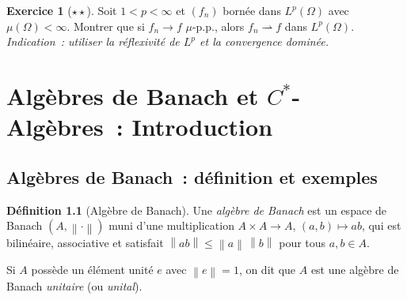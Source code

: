 \documentclass[a4paper,12pt]{book}
\newcommand{\norm}[1]{\left\| #1 \right\|}
\newcommand{\weakto}{\rightharpoonup}
\theoremstyle{definition}
\newtheorem{definition}{Définition}[chapter]
\newtheorem{exercice}{Exercice}[chapter]
\theoremstyle{plain}
\theoremstyle{remark}
\begin{document}
\begin{exercice}[$\star\star$]
Soit $1 < p < \infty$ et $(f_n)$ bornée dans $L^p(\Omega)$ avec $\mu(\Omega) < \infty$.
Montrer que si $f_n \to f$ $\mu$-p.p., alors $f_n \weakto f$ dans $L^p(\Omega)$.
\emph{Indication~: utiliser la réflexivité de $L^p$ et la convergence dominée.}
\end{exercice}


\chapter{Algèbres de Banach et $C^*$-Algèbres~: Introduction}
\label{chap:cstar}
\minitoc

\section{Algèbres de Banach~: définition et exemples}

\begin{definition}[Algèbre de Banach]
\label{def:alg-banach}
Une \emph{algèbre de Banach} est un espace de Banach $(A, \norm{\cdot})$ muni d'une
multiplication $A \times A \to A$, $(a,b) \mapsto ab$, qui est bilinéaire, associative et
satisfait $\norm{ab} \le \norm{a}\,\norm{b}$ pour tous $a, b \in A$.

Si $A$ possède un élément unité $e$ avec $\norm{e} = 1$, on dit que $A$ est une algèbre
de Banach \emph{unitaire} (ou \emph{unital}).
\end{definition}
\end{document}
